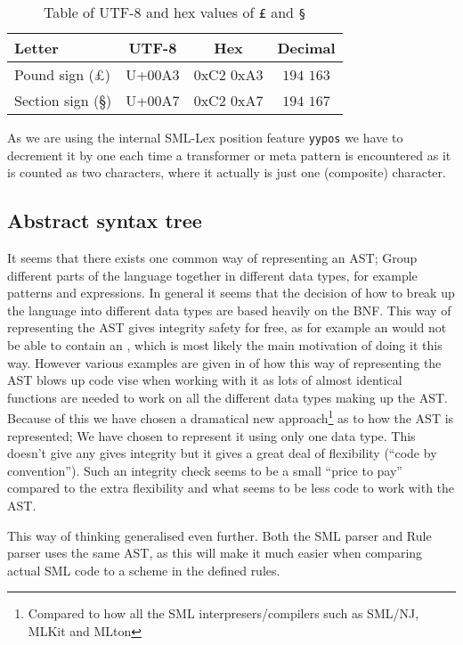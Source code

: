 \begin{table}
  \centering
  \begin{tabular}{|l|c|c|c|}
    \hline
    \textbf{Letter} & \textbf{UTF-8} & \textbf{Hex} & \textbf{Decimal} \\ \hline
    Pound sign (£)   & U+00A3 & 0xC2 0xA3 &  $194$ $163$ \\ \hline
    Section sign (§) & U+00A7 & 0xC2 0xA7 & $194$ $167$ \\ \hline
  \end{tabular}

  \caption{Table of UTF-8 and hex values of \texttt{£} and \texttt{§}}
  \label{tab:utf8-rule-values}
\end{table}

As we are using the internal SML-Lex position feature \texttt{yypos} we have to
decrement it by one each time a transformer or meta pattern is encountered as it
is counted as two characters, where it actually is just one (composite)
character.

\subsection{Abstract syntax tree}

It seems that there exists one common way of representing an AST; Group
different parts of the language together in different data types, for example
patterns and expressions. In general it seems that the decision of how to break
up the language into different data types are based heavily on the BNF. This way
of representing the AST gives integrity safety for free, as for example an
 would not be able to contain an , which is most likely
the main motivation of doing it this way. However various examples are given in
\cite{brøns-pedersen08} of how this way of representing the AST blows up code
vise when working with it as lots of almost identical functions are needed to
work on all the different data types making up the AST. Because of this we have
chosen a dramatical new approach\footnote{Compared to how all the SML
  interpresers/compilers such as SML/NJ, MLKit and MLton} as to how the AST is
represented; We have chosen to represent it using only one data type. This
doesn't give any gives integrity but it gives a great deal of flexibility
(``code by convention''). Such an integrity check seems to be a small ``price to
pay'' compared to the extra flexibility and what seems to be less code to work
with the AST.


This way of thinking generalised even further. Both the SML parser and Rule
parser uses the same AST, as this will make it much easier when comparing actual
SML code to a scheme in the defined rules.


